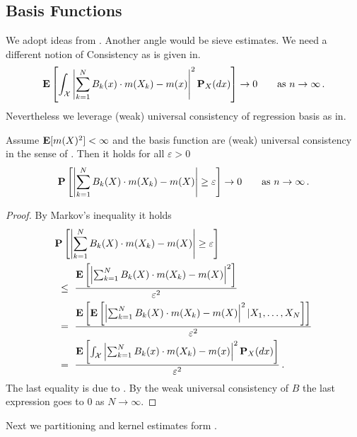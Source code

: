 \subsection*{Basis Functions}
We adopt ideas from \cite{Gyorfi2002}. Another angle would be sieve estimates\cite{Newey1997a}.
We need a different notion of
Consistency as is given 
in\cite[Definitien~1.1]{Gyorfi2002}.
\begin{gather}
  \E
  \left[ 
    \int_\mathcal{X}
    \left| 
    \sum_{k=1}^{N} 
    B_k(x)
    \cdot
    m(X_k)
    -
    m(x)
    \right|
    ^2
    \P_X(dx)
  \right]
  \to
  0
  \qquad
  \text{as}
  \ 
  n\to \infty
  \,.
\end{gather}
Nevertheless we leverage (weak) universal consistency 
of regression basis as
in\cite[Definitien~1.3]{Gyorfi2002}.
\begin{theorem}
  Assume
  $\mathbf{E}[m(X)^2]<\infty$
  and the basis function are 
(weak) universal consistency in the sense of 
\cite[Definitien~1.3]{Gyorfi2002}.
Then it holds for all $\varepsilon>0$
\begin{gather}
  \P
  \left[ 
    \left| 
    \sum_{k=1}^{N} 
    B_k(X)
    \cdot
    m(X_k)
    -
    m(X)
    \right|
    \ge
    \varepsilon
  \right]
  \to
  0
  \qquad
  \text{as}
  \ 
  n\to \infty
  \,.
\end{gather}
\end{theorem}
\begin{proof}
  By Markov's inequality it holds
  \begin{align*}
    &
  \P
  \left[ 
    \left| 
    \sum_{k=1}^{N} 
    B_k(X)
    \cdot
    m(X_k)
    -
    m(X)
    \right|
    \ge
    \varepsilon
  \right]
  \\
  &
  \ 
  \le
  \ 
  \frac
  {
  \E
  \left[ 
    \left| 
    \sum_{k=1}^{N} 
    B_k(X)
    \cdot
    m(X_k)
    -
    m(X)
    \right|
    ^2
  \right]
  }
  {\varepsilon^2}
  \\
  &
  \ 
  =
  \ 
  \frac
  {
  \E
  \left[ 
    \E
    \left[ 
    \left| 
    \sum_{k=1}^{N} 
    B_k(X)
    \cdot
    m(X_k)
    -
    m(X)
    \right|
    ^2
    |
    X_1,
    \ldots,
    X_N
    \right]
  \right]
  }
  {\varepsilon^2}
  \\
  &
  \ 
  =
  \ 
  \frac
  {
  \E
  \left[ 
    \int_\mathcal{X}
    \left| 
    \sum_{k=1}^{N} 
    B_k(x)
    \cdot
    m(X_k)
    -
    m(x)
    \right|
    ^2
    \P_X(dx)
  \right]
  }
  {\varepsilon^2}
  \,.
  \end{align*}
  The last equality is due to \cite[(1.2)]{Gyorfi2002}.
  By the weak universal consistency of $B$
  the last expression goes to $0$ as $N\to \infty$.
\end{proof}
Next we partitioning and kernel estimates form \cite[§4,§5]{Gyorfi2002}.


